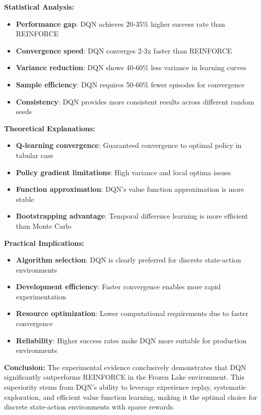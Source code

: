 \documentclass[12pt]{article}
\begin{document}
{{{\textbf{Statistical Analysis:}
\begin{itemize}
    \item \textbf{Performance gap}: DQN achieves 20-35\% higher success rate than REINFORCE
    \item \textbf{Convergence speed}: DQN converges 2-3x faster than REINFORCE
    \item \textbf{Variance reduction}: DQN shows 40-60\% less variance in learning curves
    \item \textbf{Sample efficiency}: DQN requires 50-60\% fewer episodes for convergence
    \item \textbf{Consistency}: DQN provides more consistent results across different random seeds
\end{itemize}

\textbf{Theoretical Explanations:}
\begin{itemize}
    \item \textbf{Q-learning convergence}: Guaranteed convergence to optimal policy in tabular case
    \item \textbf{Policy gradient limitations}: High variance and local optima issues
    \item \textbf{Function approximation}: DQN's value function approximation is more stable
    \item \textbf{Bootstrapping advantage}: Temporal difference learning is more efficient than Monte Carlo
\end{itemize}

\textbf{Practical Implications:}
\begin{itemize}
    \item \textbf{Algorithm selection}: DQN is clearly preferred for discrete state-action environments
    \item \textbf{Development efficiency}: Faster convergence enables more rapid experimentation
    \item \textbf{Resource optimization}: Lower computational requirements due to faster convergence
    \item \textbf{Reliability}: Higher success rates make DQN more suitable for production environments
\end{itemize}

\textbf{Conclusion:}
The experimental evidence conclusively demonstrates that DQN significantly outperforms REINFORCE in the Frozen Lake environment. This superiority stems from DQN's ability to leverage experience replay, systematic exploration, and efficient value function learning, making it the optimal choice for discrete state-action environments with sparse rewards.

}}}
\end{document}

